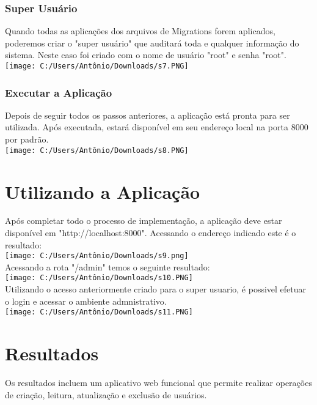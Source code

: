 \documentclass[11pt]{article} %
\begin{document}
\subsubsection{Super Usuário}
Quando todas as aplicações dos arquivos de Migrations forem aplicados, poderemos criar o "super usuário" que auditará toda e qualquer informação do sistema. Neste caso foi criado com o nome de usuário "root" e senha "root".\\
\texttt{[image: C:/Users/Antônio/Downloads/s7.PNG]}
\subsubsection{Executar a Aplicação}
Depois de seguir todos os passos anteriores, a aplicação está pronta para ser utilizada. Após executada, estará disponível em seu endereço local na porta 8000 por padrão.\\
\texttt{[image: C:/Users/Antônio/Downloads/s8.PNG]}

\maketitle
\section{Utilizando a Aplicação}
Após completar todo o processo de implementação, a aplicação deve estar disponível em "http://localhost:8000". Acessando o endereço indicado este é o resultado:\\
\texttt{[image: C:/Users/Antônio/Downloads/s9.png]}\\
Acessando a rota "/admin" temos o seguinte resultado:\\
\texttt{[image: C:/Users/Antônio/Downloads/s10.PNG]}\\
Utilizando o acesso anteriormente criado para o super usuario, é possivel efetuar o login e acessar o ambiente admnistrativo.\\
\texttt{[image: C:/Users/Antônio/Downloads/s11.PNG]}

\maketitle
\section{Resultados}
Os resultados incluem um aplicativo web funcional que permite  realizar operações de criação, leitura, atualização e exclusão de usuários.
\end{document}
